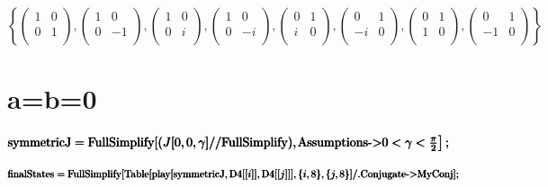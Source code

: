 \documentclass{article}
\begin{document}
\begin{doublespace}
\noindent\(\left\{\left(
\begin{array}{cc}
 1 & 0 \\
 0 & 1 \\
\end{array}
\right),\left(
\begin{array}{cc}
 1 & 0 \\
 0 & -1 \\
\end{array}
\right),\left(
\begin{array}{cc}
 1 & 0 \\
 0 & i \\
\end{array}
\right),\left(
\begin{array}{cc}
 1 & 0 \\
 0 & -i \\
\end{array}
\right),\left(
\begin{array}{cc}
 0 & 1 \\
 i & 0 \\
\end{array}
\right),\left(
\begin{array}{cc}
 0 & 1 \\
 -i & 0 \\
\end{array}
\right),\left(
\begin{array}{cc}
 0 & 1 \\
 1 & 0 \\
\end{array}
\right),\left(
\begin{array}{cc}
 0 & 1 \\
 -1 & 0 \\
\end{array}
\right)\right\}\)
\end{doublespace}

\section*{a=b=0}

\begin{doublespace}
\noindent\(\pmb{\text{symmetricJ} = \text{FullSimplify}[(J[0,0,\gamma ]\text{//}\text{FullSimplify}),}\\
\pmb{\left.\text{Assumptions}\text{-$>$}0<\gamma <\frac{\pi }{2}\right];}\)
\end{doublespace}

\begin{doublespace}
\noindent\(\pmb{\text{finalStates} = }\\
\pmb{\text{FullSimplify}[\text{Table}[\text{play}[\text{symmetricJ},\text{D4}[[i]],\text{D4}[[j]]],\{i,8\},\{j,8\}]\text{/.}}\\
\pmb{\text{Conjugate}\text{-$>$}\text{MyConj}];}\)
\end{doublespace}
\end{document}
